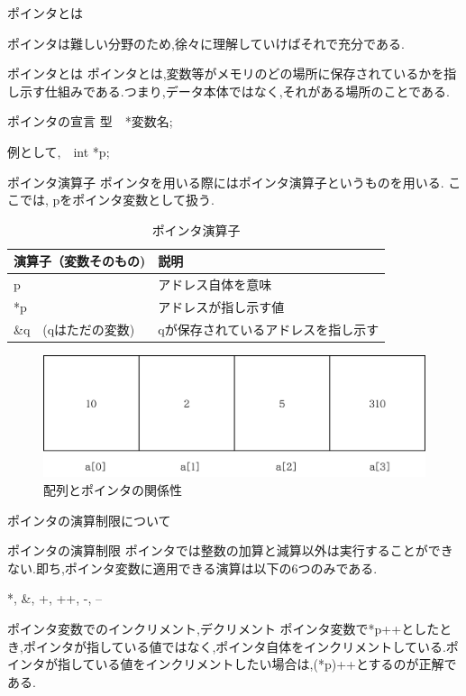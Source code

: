 \begin{frame}[allowframebreaks]{ポインタとは}
    \begin{alertblock}{}
        ポインタは難しい分野のため,徐々に理解していけばそれで充分である.
    \end{alertblock}
    \begin{block}{ポインタとは}
        ポインタとは,変数等がメモリのどの場所に保存されているかを指し示す仕組みである.つまり,データ本体ではなく,それがある場所のことである.
    \end{block}
    \begin{block}{ポインタの宣言}
        型　*変数名;

        例として,　int *p;
    \end{block}
    \begin{block}{ポインタ演算子}
        ポインタを用いる際にはポインタ演算子というものを用いる.
        ここでは, pをポインタ変数として扱う.
        \begin{table}[h]
            \centering
            \begin{tabular}{|l|l|}
                \hline
                演算子（変数そのもの) & 説明\\
                \hline
                p & アドレス自体を意味\\
                *p & アドレスが指し示す値\\
                \&q　(qはただの変数) & qが保存されているアドレスを指し示す\\
                \hline
            \end{tabular}
            \caption{ポインタ演算子}
            \label{tab:my_label}
        \end{table}
    \end{block}

    \begin{figure}[h]
        \centering
        \includegraphics[width=0.4\linewidth]{png/arr.png}
        \caption{配列とポインタの関係性}
        \label{fig:enter-label}
    \end{figure}
\end{frame}

\begin{frame}{ポインタの演算制限について}
    \begin{block}{ポインタの演算制限}
        ポインタでは整数の加算と減算以外は実行することができない.即ち,ポインタ変数に適用できる演算は以下の6つのみである.

        \centering
            *, \&, +, ++, -, --
    \end{block}
    \begin{alertblock}{ポインタ変数でのインクリメント,デクリメント}
        ポインタ変数で*p++としたとき,ポインタが指している値ではなく,ポインタ自体をインクリメントしている.ポインタが指している値をインクリメントしたい場合は,(*p)++とするのが正解である.

    \end{alertblock}
\end{frame}

